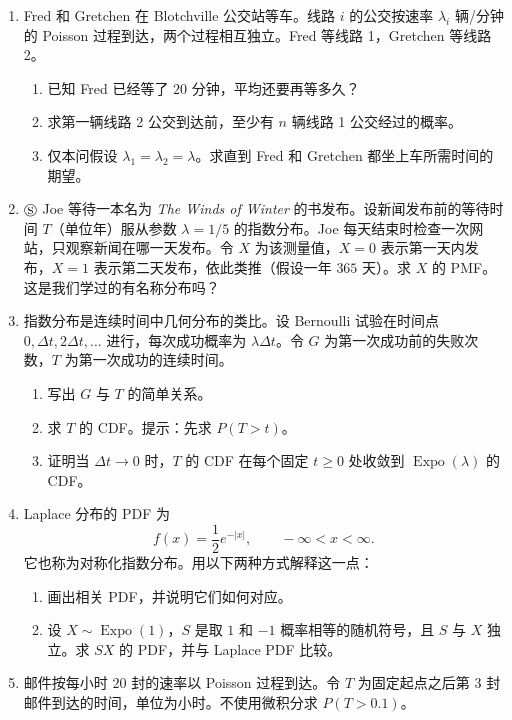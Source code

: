 \documentclass[UTF8,12pt,a4paper,fontset=fandol]{ctexart}
\begin{document}
\begin{enumerate}
  \item Fred 和 Gretchen 在 Blotchville 公交站等车。线路 $i$ 的公交按速率 $\lambda_i$ 辆/分钟的 Poisson 过程到达，两个过程相互独立。Fred 等线路 1，Gretchen 等线路 2。
  \begin{enumerate}
    \item 已知 Fred 已经等了 $20$ 分钟，平均还要再等多久？
    \item 求第一辆线路 2 公交到达前，至少有 $n$ 辆线路 1 公交经过的概率。
    \item 仅本问假设 $\lambda_1=\lambda_2=\lambda$。求直到 Fred 和 Gretchen 都坐上车所需时间的期望。
  \end{enumerate}

  \item $\circledS$ Joe 等待一本名为 \textit{The Winds of Winter} 的书发布。设新闻发布前的等待时间 $T$（单位年）服从参数 $\lambda=1/5$ 的指数分布。Joe 每天结束时检查一次网站，只观察新闻在哪一天发布。令 $X$ 为该测量值，$X=0$ 表示第一天内发布，$X=1$ 表示第二天发布，依此类推（假设一年 $365$ 天）。求 $X$ 的 PMF。这是我们学过的有名称分布吗？

  \item 指数分布是连续时间中几何分布的类比。设 Bernoulli 试验在时间点 $0,\Delta t,2\Delta t,\ldots$ 进行，每次成功概率为 $\lambda\Delta t$。令 $G$ 为第一次成功前的失败次数，$T$ 为第一次成功的连续时间。
  \begin{enumerate}
    \item 写出 $G$ 与 $T$ 的简单关系。
    \item 求 $T$ 的 CDF。提示：先求 $P(T>t)$。
    \item 证明当 $\Delta t\to0$ 时，$T$ 的 CDF 在每个固定 $t\ge0$ 处收敛到 $\operatorname{Expo}(\lambda)$ 的 CDF。
  \end{enumerate}

  \item Laplace 分布的 PDF 为
  \[
    f(x)=\frac12 e^{-|x|},\qquad -\infty<x<\infty.
  \]
  它也称为对称化指数分布。用以下两种方式解释这一点：
  \begin{enumerate}
    \item 画出相关 PDF，并说明它们如何对应。
    \item 设 $X\sim\operatorname{Expo}(1)$，$S$ 是取 $1$ 和 $-1$ 概率相等的随机符号，且 $S$ 与 $X$ 独立。求 $SX$ 的 PDF，并与 Laplace PDF 比较。
  \end{enumerate}

  \item 邮件按每小时 $20$ 封的速率以 Poisson 过程到达。令 $T$ 为固定起点之后第 $3$ 封邮件到达的时间，单位为小时。不使用微积分求 $P(T>0.1)$。


\end{enumerate}
\end{document}
